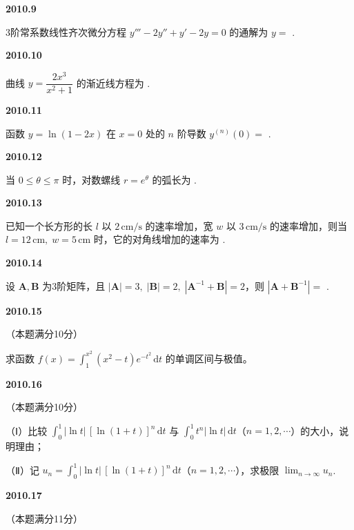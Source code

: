 \documentclass[UTF8,12pt,fontset=windows]{ctexart}
\begin{document}
\vfill
\newpage
{\large\bfseries 2010.9}

3阶常系数线性齐次微分方程 $y''' - 2y'' + y' - 2y = 0$ 的通解为 $y =$ \underline{\hspace{20mm}}.

\vfill
\newpage
{\large\bfseries 2010.10}

曲线 $y = \dfrac{2x^3}{x^2 + 1}$ 的渐近线方程为 \underline{\hspace{20mm}}.

\vfill
\newpage
{\large\bfseries 2010.11}

函数 $y = \ln(1 - 2x)$ 在 $x = 0$ 处的 $n$ 阶导数 $y^{(n)}(0) =$ \underline{\hspace{20mm}}.

\vfill
\newpage
{\large\bfseries 2010.12}

当 $0 \leqslant \theta \leqslant \pi$ 时，对数螺线 $r = e^{\theta}$ 的弧长为 \underline{\hspace{20mm}}.

\vfill
\newpage
{\large\bfseries 2010.13}

已知一个长方形的长 $l$ 以 $2\,\text{cm/s}$ 的速率增加，宽 $w$ 以 $3\,\text{cm/s}$ 的速率增加，则当 $l = 12\,\text{cm}, \; w = 5\,\text{cm}$ 时，它的对角线增加的速率为 \underline{\hspace{20mm}}.

\vfill
\newpage
{\large\bfseries 2010.14}

设 $\boldsymbol{A}, \boldsymbol{B}$ 为3阶矩阵，且 $|\boldsymbol{A}| = 3, \; |\boldsymbol{B}| = 2, \; |\boldsymbol{A}^{-1} + \boldsymbol{B}| = 2$，则 $|\boldsymbol{A} + \boldsymbol{B}^{-1}| =$ \underline{\hspace{20mm}}.

\vfill
\newpage
{\large\bfseries 2010.15}

（本题满分10分）

求函数 $f(x) = \int_1^{x^2} (x^2 - t) e^{-t^2} \,\mathrm{d}t$ 的单调区间与极值。

\vfill
\newpage
{\large\bfseries 2010.16}

（本题满分10分）

（Ⅰ）比较 $\int_0^1 |\ln t|\,[\ln(1+t)]^n \,\mathrm{d}t$ 与 $\int_0^1 t^n |\ln t| \,\mathrm{d}t$（$n = 1, 2, \cdots$）的大小，说明理由；

（Ⅱ）记 $u_n = \int_0^1 |\ln t|\,[\ln(1+t)]^n \,\mathrm{d}t$（$n = 1, 2, \cdots$），求极限 $\lim_{n \to \infty} u_n$.

\vfill
\newpage
{\large\bfseries 2010.17}

（本题满分11分）
\end{document}
